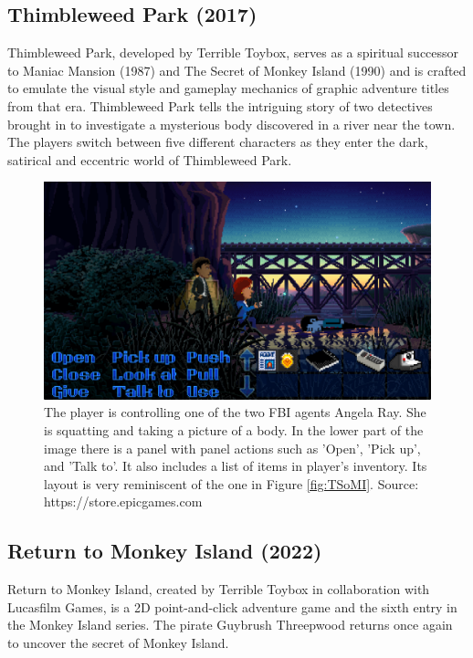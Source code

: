\subsection{Thimbleweed Park (2017)}

Thimbleweed Park, developed by Terrible Toybox, serves as a spiritual successor to Maniac Mansion (1987) and The Secret of Monkey Island (1990) and is crafted to emulate the visual style and gameplay mechanics of graphic adventure titles from that era. Thimbleweed Park tells the intriguing story of two detectives brought in to investigate a mysterious body discovered in a river near the town. The players switch between five different characters as they enter the dark, satirical and eccentric world of Thimbleweed Park\cite{Matulef2014}.


\begin{figure}[H]
\centering
\includegraphics[width=1.\linewidth]{img/TWP.png}
\caption{The player is controlling one of the two FBI agents Angela Ray. She is squatting and taking a picture of a body. In the lower part of the image there is a panel with panel actions such as 'Open', 'Pick up', and 'Talk to'. It also includes a list of items in player's inventory. Its layout is very reminiscent of the one in Figure \ref{fig:TSoMI}. Source: https://store.epicgames.com \cite{epic:TWP}}
\label{fig:TWP}
\end{figure}

\subsection{Return to Monkey Island (2022)}

Return to Monkey Island, created by Terrible Toybox in collaboration with Lucasfilm Games, is a 2D point-and-click adventure game and the sixth entry in the Monkey Island series. The pirate Guybrush Threepwood returns once again to uncover the secret of Monkey Island\cite{McCaffrey2022}.

